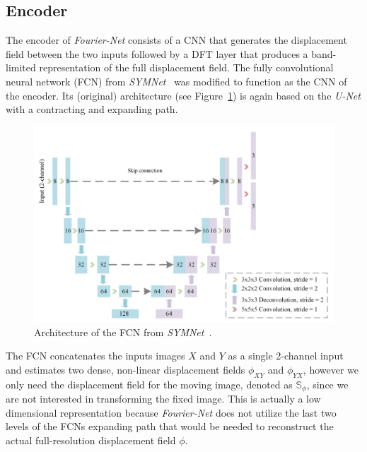 \documentclass[english,version-2022-01]{uzl-thesis} %
\begin{document}
\subsection{Encoder}	\label{SubSec:Encoder}
The encoder of \emph{Fourier-Net} consists of a CNN that generates the displacement field between the two inputs followed by a DFT layer that produces a band-limited representation of the full displacement field. The fully convolutional neural network (FCN) from \emph{SYMNet}~\cite{SYM-Net} was modified to function as the CNN of the encoder. Its (original) architecture (see Figure~\ref{fig:SYMNet}) is again based on the \emph{U-Net} with a contracting and expanding path. 
\begin{figure}[htpb]
	\centering
	\graphicspath{{images/}{\main/images/}}
	\includegraphics[width=\linewidth]{SYMNetArchitectureFCN.png} 
	\caption{Architecture of the FCN from \emph{SYMNet}~\cite{SYM-Net}.}
	\label{fig:SYMNet}
\end{figure}
The FCN concatenates the inputs images $X$ and $Y$ as a single 2-channel input and estimates two dense, non-linear displacement fields $\phi_{XY}$ and $\phi_{YX}$, however we only need the displacement field for the moving image, denoted as $\mathbb{S}_\phi$, since we are not interested in transforming the fixed image. This is actually a low dimensional representation because \emph{Fourier-Net} does not utilize the last two levels of the FCNs expanding path that would be needed to reconstruct the actual full-resolution displacement field $\phi$.\\
\end{document}
